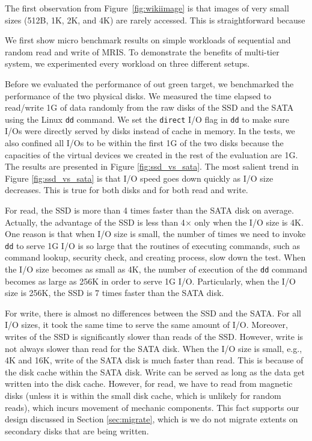 The first observation from Figure~\ref{fig:wikiimage} is that images of very
small sizes (512B, 1K, 2K, and 4K) are rarely accessed. This is
straightforward because 

We first show micro benchmark results on simple workloads of
sequential and random read and write of MRIS. To demonstrate the
benefits of multi-tier system, we experimented every workload on three
different setups. 

Before we evaluated the performance of out green target, we
benchmarked the performance of the two physical disks.  We measured
the time elapsed to read/write 1G of data randomly from the raw disks
of the SSD and the SATA using the Linux \texttt{dd} command. We set
the \texttt{direct} I/O flag in \texttt{dd} to make sure I/Os were
directly served by disks instead of cache in memory.  In the tests, we
also confined all I/Os to be within the first 1G of the two disks
because the capacities of the virtual devices we created in the rest
of the evaluation are 1G. The results are presented in Figure
\ref{fig:ssd_vs_sata}. The most salient trend in Figure
\ref{fig:ssd_vs_sata} is that I/O speed goes down quickly as I/O size
decreases. This is true for both disks and for both read and write. 

For read, the SSD is more than 4 times faster than the SATA disk on
average. Actually, the advantage of the SSD is less than 4$\times$
only when the I/O size is 4K.  One reason is that when I/O size is
small, the number of times we need to invoke \texttt{dd} to serve 1G
I/O is so large that the routines of executing commands, such as
command lookup, security check, and creating process, slow down the
test.  When the I/O size becomes as small as 4K, the number of
execution of the \texttt{dd} command becomes as large as 256K in order
to serve 1G I/O.  Particularly, when the I/O size is 256K, the SSD is
7 times faster than the SATA disk. 

For write, there is almost no differences between the SSD and the
SATA. For all I/O sizes, it took the same time to serve the same
amount of I/O. Moreover, writes of the SSD is significantly slower
than reads of the SSD.  However, write is not always slower than read
for the SATA disk. When the I/O size is small, e.g., 4K and 16K, write
of the SATA disk is much faster than read. This is because of the disk
cache within the SATA disk. Write can be served as long as the data
get written into the disk cache. However, for read, we have to read
from magnetic disks (unless it is within the small disk cache, which
is unlikely for random reads), which incurs movement of mechanic
components. This fact supports our design discussed in Section
\ref{sec:migrate}, which is we do not migrate extents on secondary
disks that are being written. 

